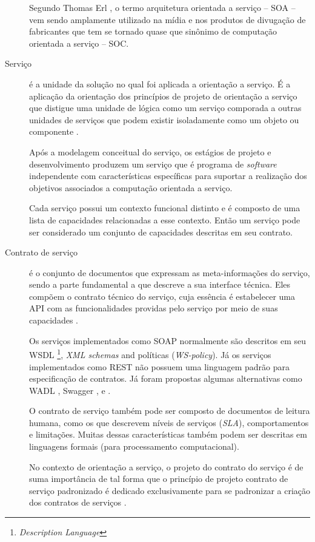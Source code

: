 \begin{description}
Segundo Thomas Erl \cite{erl2009web}, o termo arquitetura orientada a serviço --
SOA -- vem sendo amplamente utilizado na mídia e nos produtos de divugação de
fabricantes que tem se tornado quase que sinônimo de computação orientada a
serviço -- SOC.

\item [Serviço] é a unidade da solução no qual foi aplicada a orientação a
serviço. É a aplicação da orientação dos princípios de projeto de orientação a
serviço que distigue uma unidade de lógica como um serviço comporada a outras
unidades de serviços que podem existir isoladamente como um objeto ou
componente \cite{erl2009web}.

Após a modelagem conceitual do serviço, os estágios de projeto e desenvolvimento
produzem um serviço que é programa de \textit{software} independente com
características específicas para suportar a realização dos objetivos associados
a computação orientada a serviço.

Cada serviço possui um contexto funcional distinto e é composto de uma lista
de capacidades relacionadas a esse contexto. Então um serviço pode ser
considerado um conjunto de capacidades descritas em seu contrato.


\item [Contrato de serviço] é o conjunto de documentos que expressam as
meta-informações do serviço, sendo a parte fundamental a que descreve a
sua interface técnica. Eles compõem o contrato técnico do serviço, cuja essência
é estabelecer uma API com as funcionalidades providas pelo serviço por meio de
suas capacidades \cite{erl2009web}.

Os serviços implementados como \ws SOAP normalmente são descritos em seu WSDL
\footnote{\ws{} \textit{Description Language}}, \textit{XML schemas} and
políticas (\textit{WS-policy}). Já os serviços implementados como \ws{} REST não
possuem uma linguagem padrão para especificação de contratos. Já foram propostas
algumas alternativas como WADL \cite{hadley2006web}, Swagger \cite{swaggerSite},
e \neoidl{} \cite{lima2015neoidl}.

O contrato de serviço também pode ser composto de documentos de leitura humana,
como os que descrevem níveis de serviços (\textit{SLA}), comportamentos e
limitações. Muitas dessas características também podem ser descritas em
linguagens formais (para processamento computacional).

No contexto de orientação a serviço, o projeto do contrato do serviço é de suma
importância de tal forma que o princípio de projeto contrato de serviço
padronizado é dedicado exclusivamente para se padronizar a criação dos contratos
de serviços \cite{erl2009web}.

\end{description}


